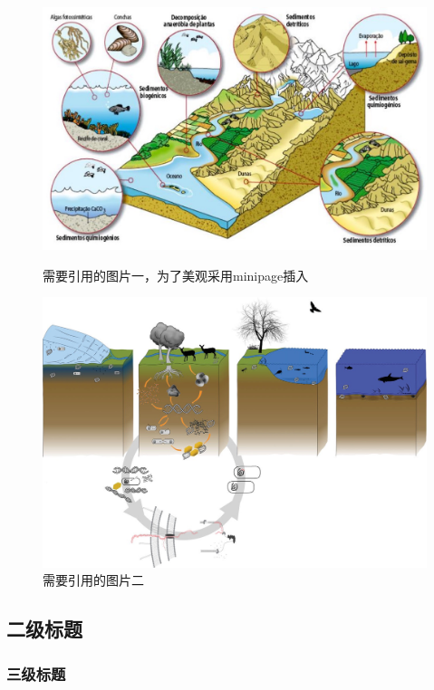 \documentclass{mystyle} %
\begin{document}
\begin{figure}[htbp]
  \centering
  \begin{minipage}[t]{0.45\textwidth}
    \centering
    \includegraphics[width=\linewidth]{img/1.jpg}
\caption{需要引用的图片一，为了美观采用minipage插入}
\label{fig:1}
  \end{minipage}
  \hfill
  \begin{minipage}[t]{0.45\textwidth}
    \centering
    \includegraphics[width=\linewidth]{img/2.jpg}
\caption{需要引用的图片二}
\label{fig:2}
  \end{minipage}
\end{figure}
\subsection{二级标题}
\subsubsection{三级标题}
\end{document}
